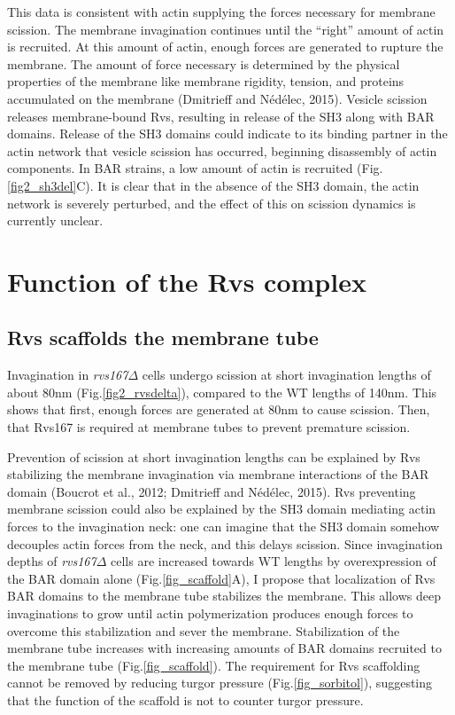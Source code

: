 \vspace{5mm}
This data is consistent with actin supplying the forces necessary for membrane scission. The membrane invagination continues until the “right” amount of actin is recruited. At this amount of actin, enough forces are generated to rupture the membrane. The amount of force necessary is determined by the physical properties of the membrane like membrane rigidity, tension, and proteins accumulated on the membrane (Dmitrieff and Nédélec, 2015). Vesicle scission releases membrane-bound Rvs, resulting in release of the SH3 along with BAR domains. Release of the SH3 domains could indicate to its binding partner in the actin network that vesicle scission has occurred, beginning disassembly of actin components. In BAR strains, a low amount of actin is recruited (Fig.\ref{fig2_sh3del}C). It is clear that in the absence of the SH3 domain, the actin network is severely perturbed, and the effect of this on scission dynamics is currently unclear. 

\section{Function of the Rvs complex}

\subsection{Rvs scaffolds the membrane tube}
Invagination in \textit{rvs167$\Delta$} cells undergo scission at short invagination lengths of about 80nm (Fig.\ref{fig2_rvsdelta}), compared to the WT lengths of 140nm. This shows that first, enough forces are generated at 80nm to cause scission. Then, that Rvs167 is required at membrane tubes to prevent premature scission. 

Prevention of scission at short invagination lengths can be explained by Rvs stabilizing the membrane invagination via membrane interactions of the BAR domain (Boucrot et al., 2012; Dmitrieff and Nédélec, 2015). Rvs preventing membrane scission could also be explained by the SH3 domain mediating actin forces to the invagination neck: one can imagine that the SH3 domain somehow decouples actin forces from the neck, and this delays scission. Since invagination depths of \textit{rvs167$\Delta$} cells are increased towards WT lengths by overexpression of the BAR domain alone (Fig.\ref{fig_scaffold}A), I propose that localization of Rvs BAR domains to the membrane tube stabilizes the membrane. This allows deep invaginations to grow until actin polymerization produces enough forces to overcome this stabilization and sever the membrane. Stabilization of the membrane tube increases with increasing amounts of BAR domains recruited to the membrane tube (Fig.\ref{fig_scaffold}). The requirement for Rvs scaffolding cannot be removed by reducing turgor pressure (Fig.\ref{fig_sorbitol}), suggesting that the function of the scaffold is not to counter turgor pressure. 

